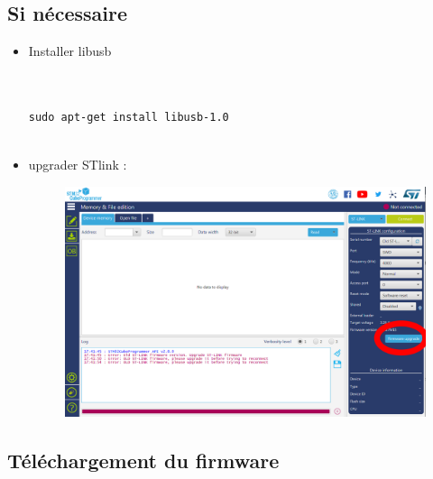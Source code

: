 \documentclass{article}
\begin{document}
\begin{itemize}
\subsection{Si nécessaire}

\begin{itemize}
    



\item Installer libusb

\begin{verbatim}


sudo apt-get install libusb-1.0


\end{verbatim}

\item  upgrader STlink :

\begin{figure}[H]
\begin{center}
\advance\leftskip-3cm
\advance\rightskip-3cm
\includegraphics[keepaspectratio=true,scale=0.3]{stlink_upgrade.png}
\label{visina8}
\end{center}\end{figure}



\end{itemize}






\subsection{Téléchargement du firmware}

\begin{enumerate}



\end{enumerate}
\end{itemize}
\end{document}
